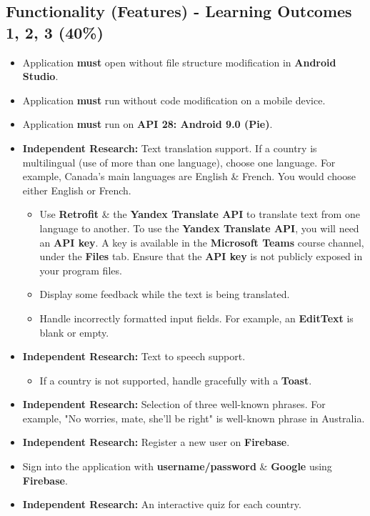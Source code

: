 \documentclass{article}
\begin{document}
\subsection*{Functionality (Features) - Learning Outcomes 1, 2, 3 (40\%)}
\begin{itemize}
	\item Application \textbf{must} open without file structure modification in \textbf{Android Studio}.
	\item Application \textbf{must} run without code modification on a mobile device.
	\item Application \textbf{must} run on \textbf{API 28: Android 9.0 (Pie)}.
	\item \textbf{Independent Research:} Text translation support. If a country is multilingual (use of more than one language), choose one language. For example, Canada's main languages are English \& French. You would choose either English or French.
	      \begin{itemize}
	      	\item Use \textbf{Retrofit} \& the \textbf{Yandex Translate API} to translate text from one language to another. To use the \textbf{Yandex Translate API}, you will need an \textbf{API key}. A key is available in the \textbf{Microsoft Teams} course channel, under the \textbf{Files} tab. Ensure that the \textbf{API key} is not publicly exposed in your program files.
	      	\item Display some feedback while the text is being translated.
	      	\item Handle incorrectly formatted input fields. For example, an \textbf{EditText} is blank or empty.
	      \end{itemize}
	\item \textbf{Independent Research:} Text to speech support.
	      \begin{itemize}
	      	\item If a country is not supported, handle gracefully with a \textbf{Toast}.
	      \end{itemize}
	\item \textbf{Independent Research:} Selection of three well-known phrases. For example, "No worries, mate, she'll be right" is well-known phrase in Australia.
	\item \textbf{Independent Research:} Register a new user on \textbf{Firebase}.
	\item Sign into the application with \textbf{username/password} \& \textbf{Google} using \textbf{Firebase}.
	\item \textbf{Independent Research:} An interactive quiz for each country.

\end{itemize}
\end{document}
